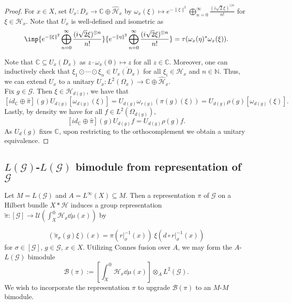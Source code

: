 \documentclass[a4paper,11pt]{article}
\numberwithin{equation}{section}
\theoremstyle{definition}
\theoremstyle{remark}
\numberwithin{equation}{section}
\newcommand{\rG}{\mathcal{G}}
\newcommand{\B}{\mathcal{B}}
\newcommand{\C}{\mathbb{C}}
\def\N{\mathbb{N}}
\def\H{\mathcal H}
\newcommand{\U}{\mathcal{U}}
\def\sub{\subseteq}
\providecommand{\norm}[1]{\lVert#1\rVert}
\newcommand{\lr}[1]{\left(#1\right)}
\newcommand*\cls[1]{\overline{#1}}
\numberwithin{equation}{section}
\begin{document}
\begin{proof}
  For $ x\in X $, set $ U_{x}:D_{x}\to \C\oplus \widehat{\H}_{x} $ by $ \omega_{x}(\xi)\mapsto e^{-\norm{\xi}^{2}}\bigoplus_{n=0}^{\infty}\frac{(i \sqrt{2} \xi)^{\odot n}}{n!} $ for $ \xi\in \H_{x} $. Note that $ U_{x} $ is well-defined and isometric as 
  $$
    \inp{e^{-\norm{\xi}^{2}}\bigoplus_{n=0}^{\infty}\frac{(i \sqrt{2} \xi)^{\odot n}}{n!}}{e^{-\norm{\eta}^{2}}\bigoplus_{n=0}^{\infty}\frac{(i \sqrt{2} \xi)^{\odot n}}{n!}} = \tau(\omega_{x}(\eta)^{*} \omega_{x}(\xi)).
  $$

  Note that $ \C\sub U_{x}(D_{x}) $ as $ z \cdot\omega_{x}(0)\mapsto z $ for all $ z\in \C $. Moreover, one can inductively check that $ \xi_{1}\odot \cdots \odot \xi_{n} \in \cls{U_{x}(D_{x})} $ for all $ \xi_{i}\in \H_{x} $ and $ n\in \N $. Thus, we can extend $ U_{x} $ to a unitary $ U_{x}: L^{2}(\Omega_{x})\to \C\oplus \widehat{\H}_{x} $.\\

  Fix $g\in \rG$. Then $\xi\in \H_{d(g)}$, we have that 
  \[
    [id_{\C}\oplus \widehat{\pi}](g) U_{d(g)} [\omega_{d(g)}(\xi)] =  U_{d(g)} \omega_{r(g)}(\pi(g)(\xi)) = U_{d(g)} \rho(g)[\omega_{d(g)}(\xi)].
  \]
    Lastly, by density we have for all $f\in L^2(\Omega_{d(g)})$,
    \[
        [id_{\C}\oplus \widehat{\pi}](g) U_{d(g)} f =U_{d(g)} \rho(g)f.
    \]
    As $U_d(g)$ fixes $\C$, upon restricting to the orthocomplement we obtain a unitary equivalence.
\end{proof}

\subsection{$ L(\rG) $-$ L(\rG) $ bimodule from representation of $ \rG $}

Let $ M = L(\rG) $ and $ A = L^{\infty}(X) \sub M $. Then a representation $ \pi $ of $ \rG $ on a Hilbert bundle $ X\ast \H $ induces a group representation $ \widetilde{\pi}: [\rG]\to \U\lr{\int_{X}^{\oplus}\H_{x} \dd{\mu(x)}} $ by 

\[
  (\widetilde{\pi}_{\sigma}(g) \xi)(x) = \pi(r\vert_{\sigma}^{-1}(x)) \ \xi(d\circ r\vert_{\sigma}^{-1}(x))
\]
for $ \sigma\in [\rG] $, $ g\in\rG $, $ x\in X $. Utilizing Connes fusion over $ A $, we may form the $ A $-$ L(\rG) $ bimodule
\[
  \B(\pi) := \left[ \int_{X}^{\oplus}\H_{x}\dd{\mu(x)}\right] \otimes_{A} L^{2}(\rG).
\]
We wish to incorporate the representation $ \pi $ to upgrade $ \B(\pi) $ to an $ M $-$ M $ bimodule.
\end{document}

